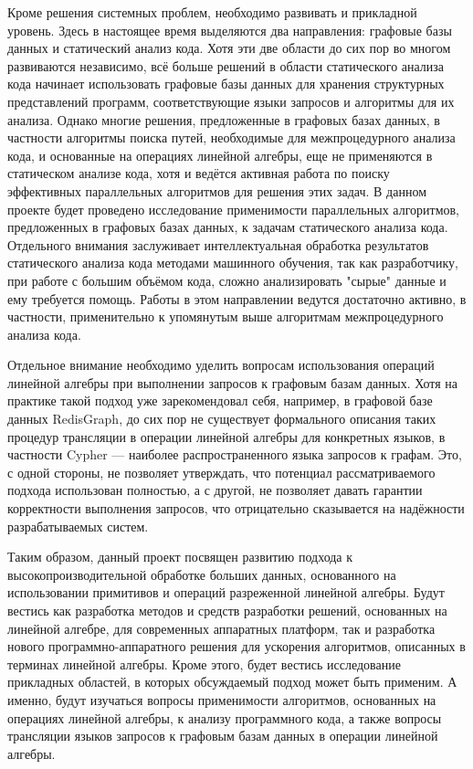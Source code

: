 \documentclass[12pt]{article}  %
\theoremstyle{remark}
\begin{document}
Кроме решения системных проблем, необходимо развивать и прикладной уровень. Здесь в настоящее время выделяются два направления: графовые базы данных и статический анализ кода. Хотя эти две области до сих пор во многом развиваются независимо, всё больше решений в области статического анализа кода начинает использовать графовые базы данных для хранения структурных представлений программ, соответствующие языки запросов и алгоритмы для их анализа. Однако многие решения, предложенные в графовых базах данных, в частности алгоритмы поиска путей, необходимые для межпроцедурного анализа кода, и основанные на операциях линейной алгебры, еще не применяются в статическом анализе кода, хотя и ведётся активная работа по поиску эффективных параллельных алгоритмов для решения этих задач. В данном проекте будет проведено исследование применимости параллельных алгоритмов, предложенных в графовых базах данных, к задачам статического анализа кода. Отдельного внимания заслуживает интеллектуальная обработка результатов статического анализа кода методами машинного обучения, так как разработчику, при работе с большим объёмом кода, сложно анализировать "сырые" данные и ему требуется помощь. Работы в этом направлении ведутся достаточно активно, в частности, применительно к упомянутым выше алгоритмам межпроцедурного анализа кода. 

Отдельное внимание необходимо уделить вопросам использования операций линейной алгебры при выполнении запросов к графовым базам данных. Хотя на практике такой подход уже зарекомендовал себя, например, в графовой базе данных RedisGraph, до сих пор не существует формального описания таких процедур трансляции в операции линейной алгебры для конкретных языков, в частности Cypher --- наиболее распространенного языка запросов к графам. Это, с одной стороны, не позволяет утверждать, что потенциал рассматриваемого подхода использован полностью, а с другой, не позволяет давать гарантии корректности выполнения запросов, что отрицательно сказывается на надёжности разрабатываемых систем.

Таким образом, данный проект посвящен развитию подхода к высокопроизводительной обработке больших данных, основанного на использовании примитивов и операций разреженной линейной алгебры. Будут вестись как разработка методов и средств разработки решений, основанных на линейной алгебре, для современных аппаратных платформ, так и разработка нового программно-аппаратного решения для ускорения алгоритмов, описанных в терминах линейной алгебры. Кроме этого, будет вестись исследование прикладных областей, в которых обсуждаемый подход может быть применим. А именно, будут изучаться вопросы применимости алгоритмов, основанных на операциях линейной алгебры, к анализу программного кода, а также вопросы трансляции языков запросов к графовым базам данных в операции линейной алгебры.
\end{document}
